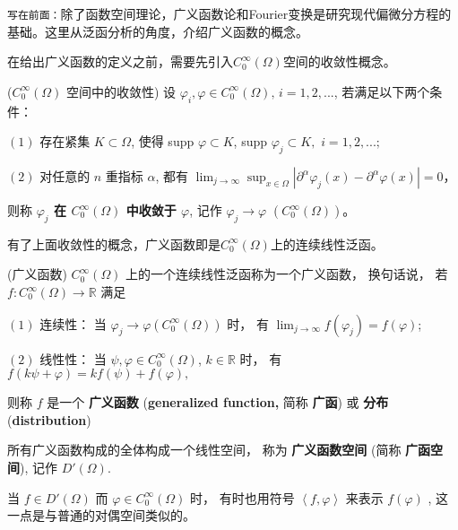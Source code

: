 
\verb|写在前面：|除了函数空间理论，广义函数论和Fourier变换是研究现代偏微分方程的基础。这里从泛函分析的角度，介绍广义函数的概念。

在给出广义函数的定义之前，需要先引入$C_0^\infty(\Omega)$空间的收敛性概念。

\begin{definition}{($C_0^\infty(\Omega)$ 空间中的收敛性)}
设 $\varphi_i,\varphi\in C_0^\infty(\Omega),\,i=1,2,...$,  若满足以下两个条件：

$(1)$ 存在紧集 $K\subset\Omega$, 使得 supp $\varphi\subset K$, supp $\varphi_{j}\subset K,$
$i=1,2,...;$ 

$(2)$ 对任意的 $n$ 重指标 $\alpha$, 都有 ${\displaystyle \lim_{j\rightarrow\infty}{\displaystyle \sup_{x\in\Omega}\left|\partial^{\alpha}\varphi_{j}(x)-\partial^{\alpha}\varphi(x)\right|=0}}$，


则称\textbf{ \textbf{$\varphi_{j}$ 在 $C_{0}^{\infty}(\Omega)$ 中收敛于 $\varphi$}}, 记作 
$\varphi_{j}\rightarrow\varphi$ $(C_{0}^{\infty}(\Omega))$。

\end{definition}

有了上面收敛性的概念，广义函数即是$C_0^\infty(\Omega)$上的连续线性泛函。

\begin{definition}{(广义函数)}
$C_{0}^{\infty}(\Omega)$ 上的一个连续线性泛函称为一个广义函数， 换句话说， 若 $f:C_{0}^{\infty}(\Omega)\rightarrow\mathbb{R}$
满足

$(1)$ 连续性： 当 $\varphi_{j}\rightarrow\varphi(C_{0}^{\infty}(\Omega))$
时， 有 ${\displaystyle \lim_{j\rightarrow\infty}f(\varphi_{j})=f(\varphi)}$; 

$(2)$ 线性性： 当 $\psi,\varphi\in C_{0}^{\infty}(\Omega)$, $k\in\mathbb{R}$
时， 有 $f(k\psi+\varphi)=kf(\psi)+f(\varphi),$

则称 $f$ 是一个 \textbf{广义函数} (\textbf{generalized function,} 简称 \textbf{广函}) 或 \textbf{分布} (\textbf{distribution})

所有广义函数构成的全体构成一个线性空间， 称为 \textbf{广义函数空间} (简称 \textbf{广函空间}), 记作 $D'(\Omega)$. 

当 $f\in D'(\Omega)$ 而 $\varphi\in C^\infty_0(\Omega)$ 时， 有时也用符号 $\left \langle f,\varphi \right \rangle $ 来表示 $f(\varphi)$ , 这一点是与普通的对偶空间类似的。

\end{definition}

